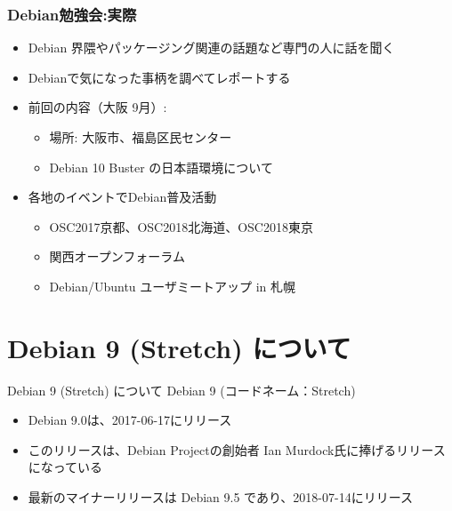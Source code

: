 \documentclass[cjk,dvipdfmx,10pt,compress,%
hyperref={bookmarks=true,bookmarksnumbered=true,bookmarksopen=false,%
colorlinks=false,%
pdftitle={第 132 回 関西 Debian 勉強会},%
pdfauthor={かわだ},%
pdfsubject={資料},%
}]{beamer}
\begin{document}
\begin{frame}
 \frametitle{Debian勉強会:実際}
 \begin{itemize}
  \item Debian 界隈やパッケージング関連の話題など専門の人に話を聞く
  \item Debianで気になった事柄を調べてレポートする
  \item 前回の内容（大阪 9月）:\\
	\begin{itemize}
	\item 場所: 大阪市、福島区民センター
	\item Debian 10 Buster の日本語環境について
	\end{itemize}
  \item 各地のイベントでDebian普及活動
	\begin{itemize}
      \item OSC2017京都、OSC2018北海道、OSC2018東京
      \item 関西オープンフォーラム
	  \item Debian/Ubuntu ユーザミートアップ in 札幌
	\end{itemize}
 \end{itemize}
\end{frame}

\section{Debian 9 (Stretch) について}
\begin{frame}{Debian 9 (Stretch) について}%
Debian 9 (コードネーム：Stretch)
\begin{itemize}
  \item Debian 9.0は、2017-06-17にリリース
  \item このリリースは、Debian Projectの創始者 Ian Murdock氏に捧げるリリースになっている
  \item 最新のマイナーリリースは Debian 9.5 であり、2018-07-14にリリース
\end{itemize}
  \begin{center}
  \end{center}
\end{frame}
\end{document}
